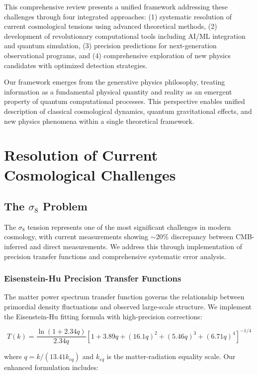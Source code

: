 \documentclass[12pt,a4paper]{article}
\begin{document}
This comprehensive review presents a unified framework addressing these challenges through four integrated approaches: (1) systematic resolution of current cosmological tensions using advanced theoretical methods, (2) development of revolutionary computational tools including AI/ML integration and quantum simulation, (3) precision predictions for next-generation observational programs, and (4) comprehensive exploration of new physics candidates with optimized detection strategies.

Our framework emerges from the generative physics philosophy, treating information as a fundamental physical quantity and reality as an emergent property of quantum computational processes. This perspective enables unified description of classical cosmological dynamics, quantum gravitational effects, and new physics phenomena within a single theoretical framework.

\section{Resolution of Current Cosmological Challenges}

\subsection{The $\sigma_8$ Problem}

The $\sigma_8$ tension represents one of the most significant challenges in modern cosmology, with current measurements showing $\sim$20\% discrepancy between CMB-inferred and direct measurements. We address this through implementation of precision transfer functions and comprehensive systematic error analysis.

\subsubsection{Eisenstein-Hu Precision Transfer Functions}

The matter power spectrum transfer function governs the relationship between primordial density fluctuations and observed large-scale structure. We implement the Eisenstein-Hu fitting formula with high-precision corrections:

\begin{equation}
T(k) = \frac{\ln(1 + 2.34q)}{2.34q} \left[ 1 + 3.89q + (16.1q)^2 + (5.46q)^3 + (6.71q)^4 \right]^{-1/4}
\end{equation}

where $q = k/(13.41k_{eq})$ and $k_{eq}$ is the matter-radiation equality scale. Our enhanced formulation includes:
\end{document}
